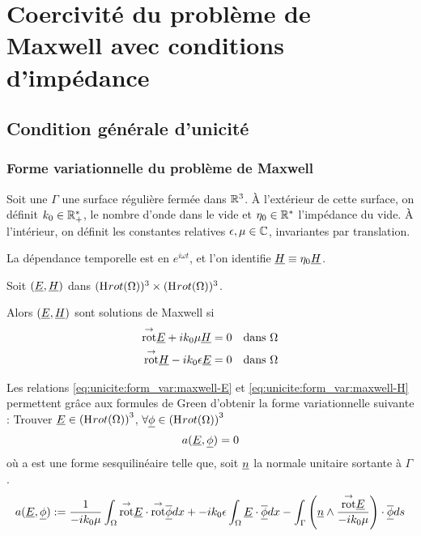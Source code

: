 \section{Coercivité du problème de Maxwell avec conditions d'impédance}
\subsection{Condition générale d'unicité}
\subsubsection{Forme variationnelle du problème de Maxwell}

Soit une $\Gamma$ une surface régulière fermée dans $\mathbb R^3$. 
À l'extérieur de cette surface, on définit $k_0 \in \mathbb R_+^*$, le nombre d'onde dans le vide et $\eta_0 \in \mathbb R^*$ l'impédance du vide.
À l'intérieur, on définit les constantes relatives $\epsilon,\mu \in \mathbb C$, invariantes par translation.

\begin{tcolorbox}
\centering
La dépendance temporelle est en $e^{i\omega t}$, et l'on identifie $\underline{H} \equiv \eta _0 \underline{H}$.
\end{tcolorbox}



Soit $(\underline{E},\underline{H})$ dans $(\mathrm{H}_\mathrm{{}}{rot}(\Omega))^3 \times (\mathrm{H}_\mathrm{{}}{rot}(\Omega))^3$. 

Alors $(\underline{E},\underline{H})$ sont solutions de Maxwell si 
\begin{align}
\label{eq:unicite:form_var:maxwell-E}
{{\overset{\rightarrow}{\operatorname{rot}}}} \underline{E} + ik_0 \mu \underline{H} &= 0 && \text{dans $\Omega$}
\\\label{eq:unicite:form_var:maxwell-H}
{{\overset{\rightarrow}{\operatorname{rot}}}} \underline{H} - ik_0\epsilon \underline{E} &= 0 && \text{dans $\Omega$}
  \end{align}

Les relations \eqref{eq:unicite:form_var:maxwell-E} et \eqref{eq:unicite:form_var:maxwell-H} permettent grâce aux formules de Green d'obtenir la forme variationnelle suivante :
Trouver $\underline{E} \in \left(\mathrm{H}_\mathrm{{}}{rot}(\Omega)\right)^3$, $\forall \underline{\phi} \in \left(\mathrm{H}_\mathrm{{}}{rot}(\Omega)\right)^3$
\[
a(\underline{E},\underline{\phi}) = 0
\]
où a est une forme sesquilinéaire telle que, soit $\underline{n}$ la normale unitaire sortante à $\Gamma$.
\begin{align*}
a(\underline{E},\underline{\phi}) &:=  \dfrac{1}{-ik_0\mu} \int_\Omega {{\overset{\rightarrow}{\operatorname{rot}}}} \underline{E} \cdot {{\overset{\rightarrow}{\operatorname{rot}}}} {\overline{\underline{\phi}}} dx + -ik_0\epsilon\int_\Omega\underline{E}\cdot{\overline{\underline{\phi}}} dx
 - \int_\Gamma \left(\underline{n} \wedge \dfrac{{{\overset{\rightarrow}{\operatorname{rot}}}} \underline{E}}{-ik_0\mu}\right) \cdot {\overline{\underline{\phi}}} ds \\
 \end{align*}

